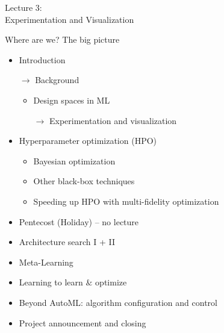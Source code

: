 \begin{frame}[c]{}

\centering
\huge
Lecture 3:\\
Experimentation and Visualization
\end{frame}
\begin{frame}[c]{Where are we? The big picture}

\begin{itemize}
	\item Introduction
	\item[$\to$] Background
	\begin{itemize}
		\item Design spaces in ML
		\item[$\to$] Experimentation and visualization
	\end{itemize}
	\item Hyperparameter optimization (HPO)
	\begin{itemize}
	  \item Bayesian optimization
	  \item Other black-box techniques
	  \item Speeding up HPO with multi-fidelity optimization
	\end{itemize}
	\item Pentecost (Holiday) -- no lecture
	\item Architecture search I + II
	\item Meta-Learning
	\item Learning to learn $\&$ optimize
	\item Beyond AutoML: algorithm configuration and control
	\item Project announcement and closing
\end{itemize}


\end{frame}
